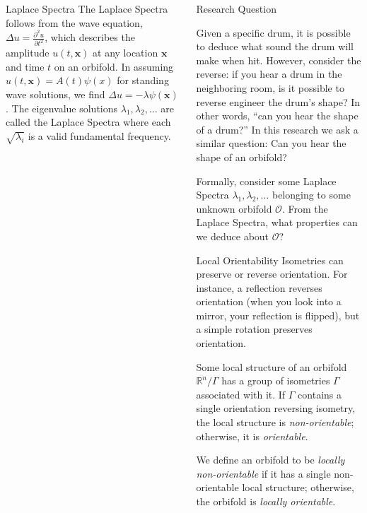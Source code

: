 \documentclass[final]{beamer}
\newlength{\onecolwid}
\newcommand{\pdder}[2]{\frac{\partial^2#1}{\partial#2^2}}
\begin{document}
\begin{frame}[t]
\begin{columns}[t]
\begin{column}{\onecolwid}
\begin{block}{Laplace Spectra}
The Laplace Spectra follows from the wave equation, $\Delta u =
\pdder{u}{t}$, which describes the amplitude $u(t,\mathbf{x})$ at any location
$\mathbf{x}$ and time $t$ on an orbifold. In assuming
$u(t,\mathbf{x})=A(t)\psi(x)$ for standing wave solutions, we find $\Delta u
= -\lambda \psi(\mathbf{x})$. The eigenvalue solutions
$\lambda_1,\lambda_2,\dots$ are called the Laplace Spectra where each
$\sqrt{\lambda_i}$ is a valid fundamental frequency.
    \end{block}

\end{column}
\begin{column}{\onecolwid} %
\begin{block}{Research Question}

Given a specific drum, it is possible to deduce what sound the drum will
make when hit. However, consider the reverse: if you hear a drum in the
neighboring room, is it possible to reverse engineer the drum's shape? In other words, ``can you hear
the shape of a drum?'' In this research we ask a similar question: Can you
hear the shape of an orbifold?

Formally, consider some Laplace Spectra $\lambda_1, \lambda_2, \dots$
belonging to some unknown orbifold $\mathcal{O}$. From the Laplace Spectra,
what properties can we deduce about $\mathcal{O}$?

\end{block}

\begin{block}{Local Orientability}
Isometries can preserve or reverse orientation. For instance, a reflection
reverses orientation (when you look into a mirror, your reflection is
flipped), but a simple rotation preserves orientation. 

Some local structure of an orbifold $\mathbb{R}^n/\Gamma$ has a group of 
isometries $\Gamma$ associated with it. If $\Gamma$ contains a single
orientation reversing isometry, the local structure is
\emph{non-orientable}; otherwise, it is \emph{orientable}.

We define an orbifold to be \emph{locally non-orientable} if it has a
single non-orientable local structure; otherwise, the orbifold is
\emph{locally orientable}.

\end{block}


\end{column}
\end{columns}
\end{frame}
\end{document}
